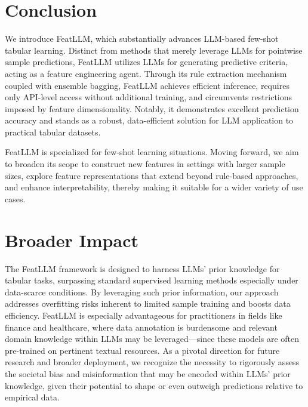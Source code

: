 \section{Conclusion}
We introduce \textsf{FeatLLM}, which substantially advances LLM-based few-shot tabular learning. Distinct from methods that merely leverage LLMs for pointwise sample predictions, \textsf{FeatLLM} utilizes LLMs for generating predictive criteria, acting as a feature engineering agent. Through its rule extraction mechanism coupled with ensemble bagging, \textsf{FeatLLM} achieves efficient inference, requires only API-level access without additional training, and circumvents restrictions imposed by feature dimensionality. Notably, it demonstrates excellent prediction accuracy and stands as a robust, data-efficient solution for LLM application to practical tabular datasets.

\textsf{FeatLLM} is specialized for few-shot learning situations. Moving forward, we aim to broaden its scope to construct new features in settings with larger sample sizes, explore feature representations that extend beyond rule-based approaches, and enhance interpretability, thereby making it suitable for a wider variety of use cases.

\section{Broader Impact}
The \textsf{FeatLLM} framework is designed to harness LLMs’ prior knowledge for tabular tasks, surpassing standard supervised learning methods especially under data-scarce conditions. By leveraging such prior information, our approach addresses overfitting risks inherent to limited sample training and boosts data efficiency. \textsf{FeatLLM} is especially advantageous for practitioners in fields like finance and healthcare, where data annotation is burdensome and relevant domain knowledge within LLMs may be leveraged—since these models are often pre-trained on pertinent textual resources. As a pivotal direction for future research and broader deployment, we recognize the necessity to rigorously assess the societal bias and misinformation that may be encoded within LLMs’ prior knowledge, given their potential to shape or even outweigh predictions relative to empirical data.

